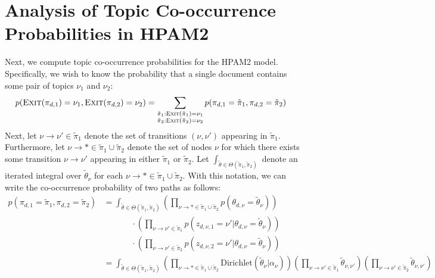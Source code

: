 \documentclass{article}
\theoremstyle{definition}
\newcommand{\Dirichlet}{\text{Dirichlet}}
\newcommand{\Exit}{\textsc{Exit}}
\begin{document}
\section{Analysis of Topic Co-occurrence Probabilities in HPAM2}

Next, we compute topic co-occurrence probabilities for the HPAM2 model.
Specifically, we wish to know the probability that a single document contains some pair of topics $\nu_1$ and $\nu_2$:
\begin{align}
p(\Exit(\pi_{d,1}) = \nu_1,
  \Exit(\pi_{d,2}) = \nu_2)
&=
\sum_{
  \substack{
    \tilde\pi_1 : \Exit(\tilde\pi_1) = \nu_1
    \\
    \tilde\pi_2 : \Exit(\tilde\pi_2) = \nu_2
  }
}
p(\pi_{d,1} = \tilde\pi_1, \pi_{d,2} = \tilde\pi_2)
\end{align}
Next, let $\nu \to \nu' \in \tilde\pi_1$ denote the set of transitions $(\nu, \nu')$ appearing in $\tilde\pi_1$.
Furthermore, let $\nu \to * \in \tilde\pi_1 \cup \tilde\pi_2$ denote the set of nodes $\nu$ for which there exists some transition $\nu \to \nu'$ appearing in either $\tilde\pi_1$ or $\tilde\pi_2$.
Let $\int_{\tilde\theta \in \Theta(\tilde\pi_1, \tilde\pi_2)}$ denote an iterated integral over $\tilde\theta_\nu$ for each $\nu \to * \in \tilde\pi_1 \cup \tilde\pi_2$.
With this notation, we can write the co-occurrence probability of two paths as follows:
\begin{align}
p(\pi_{d,1} = \tilde\pi_1, \pi_{d,2} = \tilde\pi_2)
&=
\int_{\tilde\theta \in \Theta(\tilde\pi_1, \tilde\pi_2)}
  \left(
    \prod_{\nu \to * \in \tilde\pi_1 \cup \tilde\pi_2}
    p(\theta_{d,\nu} = \tilde\theta_\nu)
  \right)
  \\ &\phantom{=}\qquad \cdot
  \left(
    \prod_{\nu \to \nu' \in \tilde\pi_1}
    p(z_{d,\nu,1} = \nu' | \theta_{d,\nu} = \tilde\theta_\nu)
  \right)
  \\ &\phantom{=}\qquad \cdot
  \left(
    \prod_{\nu \to \nu' \in \tilde\pi_2}
    p(z_{d,\nu,2} = \nu' | \theta_{d,\nu} = \tilde\theta_\nu)
  \right)
\\
&=
\int_{\tilde\theta \in \Theta(\tilde\pi_1, \tilde\pi_2)}
  \left(
    \prod_{\nu \to * \in \tilde\pi_1 \cup \tilde\pi_2}
    \Dirichlet(\tilde\theta_\nu | \alpha_\nu)
  \right)
  \left(
    \prod_{\nu \to \nu' \in \tilde\pi_1}
    \tilde\theta_{\nu,\nu'}
  \right)
  \left(
    \prod_{\nu \to \nu' \in \tilde\pi_2}
    \tilde\theta_{\nu,\nu'}
  \right)
\end{align}
\end{document}

